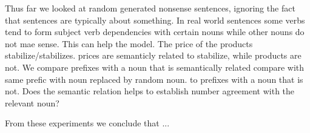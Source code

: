 Thus far we looked at random generated nonsense
sentences, ignoring the fact that sentences 
are typically about something.
In real world sentences some verbs 
tend to form subject verb dependencies with certain nouns
while other nouns do not mae sense.
This can help the model.
The price of the products stabilize/stabilizes.
prices are semanticly related to stabilize,
while products are not.
We compare prefixes with a noun that
is semantically related 
compare with same prefic with noun replaced by random noun.
to prefixes with a noun that is not.
Does the semantic relation helps to establish
number agreement with the relevant noun?

From these experiments we conclude that
...
